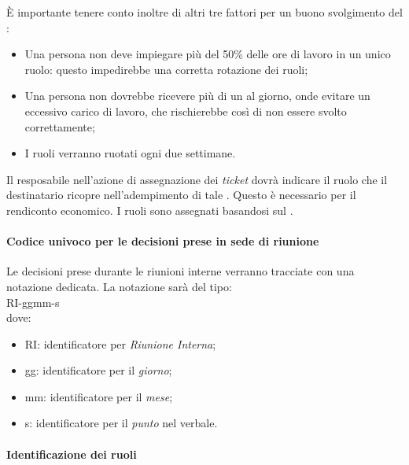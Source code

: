 È importante tenere conto inoltre di altri tre fattori per un buono svolgimento del :
\begin{itemize}

\item Una persona non deve impiegare più del 50\% delle ore di lavoro in un unico ruolo: questo impedirebbe una corretta rotazione dei ruoli;
\item Una persona non dovrebbe ricevere più di un  al giorno, onde evitare un eccessivo carico di lavoro, che rischierebbe cos\`i di non essere svolto correttamente;
\item I ruoli verranno ruotati ogni due settimane.

\end{itemize}

Il resposabile nell'azione di assegnazione dei \textit{ticket} dovr\`a indicare il ruolo che il destinatario ricopre nell'adempimento di tale . Questo \`e necessario per il rendiconto economico. I ruoli sono assegnati basandosi sul \PianoDiProgetto.



\paragraph*{Codice univoco per le decisioni prese in sede di riunione}
Le decisioni prese durante le riunioni interne verranno tracciate con una notazione dedicata.
La notazione sar\`a del tipo: \\
RI-ggmm-s \\
dove:
\begin{itemize}
\item RI: identificatore per \textit{Riunione Interna};
\item gg: identificatore per il \textit{giorno};
\item mm: identificatore per il \textit{mese};
\item s: identificatore per il \textit{punto} nel verbale.
\end{itemize}



\paragraph*{Identificazione dei ruoli}


